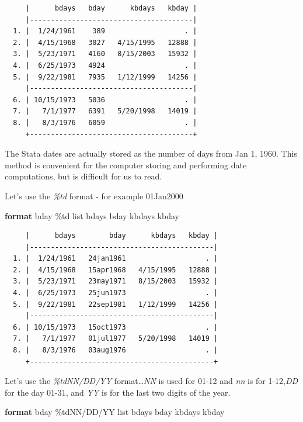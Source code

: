 \documentclass[
]{book}
\newenvironment{Shaded}{\begin{snugshade}}{\end{snugshade}}
\newcommand{\KeywordTok}[1]{\textcolor[rgb]{0.13,0.29,0.53}{\textbf{#1}}}
\newcommand{\NormalTok}[1]{#1}
\newcommand{\OtherTok}[1]{\textcolor[rgb]{0.56,0.35,0.01}{#1}}
\begin{document}
\begin{verbatim}
     |      bdays   bday      kbdays   kbday |
     |---------------------------------------|
  1. |  1/24/1961    389                   . |
  2. |  4/15/1968   3027   4/15/1995   12888 |
  3. |  5/23/1971   4160   8/15/2003   15932 |
  4. |  6/25/1973   4924                   . |
  5. |  9/22/1981   7935   1/12/1999   14256 |
     |---------------------------------------|
  6. | 10/15/1973   5036                   . |
  7. |   7/1/1977   6391   5/20/1998   14019 |
  8. |   8/3/1976   6059                   . |
     +---------------------------------------+
\end{verbatim}

The Stata dates are actually stored as the number of days from Jan 1, 1960. This method is convenient for the computer storing and performing date computations, but is difficult for us to read.

Let's use the \emph{\%td} format - for example 01Jan2000

\begin{Shaded}
\begin{Highlighting}[]
\KeywordTok{format}\NormalTok{ bday \%td }
\OtherTok{list}\NormalTok{ bdays bday kbdays kbday}
\end{Highlighting}
\end{Shaded}

\begin{verbatim}
     |      bdays        bday      kbdays   kbday |
     |--------------------------------------------|
  1. |  1/24/1961   24jan1961                   . |
  2. |  4/15/1968   15apr1968   4/15/1995   12888 |
  3. |  5/23/1971   23may1971   8/15/2003   15932 |
  4. |  6/25/1973   25jun1973                   . |
  5. |  9/22/1981   22sep1981   1/12/1999   14256 |
     |--------------------------------------------|
  6. | 10/15/1973   15oct1973                   . |
  7. |   7/1/1977   01jul1977   5/20/1998   14019 |
  8. |   8/3/1976   03aug1976                   . |
     +--------------------------------------------+
\end{verbatim}

Let's use the \emph{\%tdNN/DD/YY} format\ldots{}\emph{NN} is used for 01-12 and \emph{nn} is for 1-12,\emph{DD} for the day 01-31, and \emph{YY} is for the last two digits of the year.

\begin{Shaded}
\begin{Highlighting}[]
\KeywordTok{format}\NormalTok{ bday \%tdNN/DD/YY}
\OtherTok{list}\NormalTok{ bdays bday kbdays kbday}
\end{Highlighting}
\end{Shaded}
\end{document}
